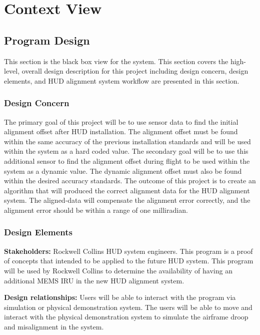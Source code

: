 \section{Context View}
	\subsection{Program Design}
	This section is the black box view for the system. This section covers the high-level, overall design description for this project including design concern, design elements, and HUD alignment system workflow are presented in this section. 

		\subsubsection{Design Concern}
		The primary goal of this project will be to use sensor data to find the initial alignment offset after HUD installation. The alignment offset must be found within the same accuracy of the previous installation standards and will be used within the system as a hard coded value. The secondary goal will be to use this additional sensor to find the alignment offset during flight to be used within the system as a dynamic value. The dynamic alignment offset must also be found within the desired accuracy standards. The outcome of this project is to create an algorithm that will produced the correct alignment data for the HUD alignment system. The aligned-data will compensate the alignment error correctly, and the alignment error should be within a range of one milliradian. 

		\subsubsection{Design Elements}
		\textbf{Stakeholders:} Rockwell Collins HUD system engineers. This program is a proof of concepts that intended to be applied to the future HUD system. This program will be used by Rockwell Collins to determine the availability of having an additional MEMS IRU in the new HUD alignment system. 

		\textbf{Design relationships:} Users will be able to interact with the program via simulation or physical demonstration system. The users will be able to move and interact with the physical demonstration system to simulate the airframe droop and misalignment in the system. 


